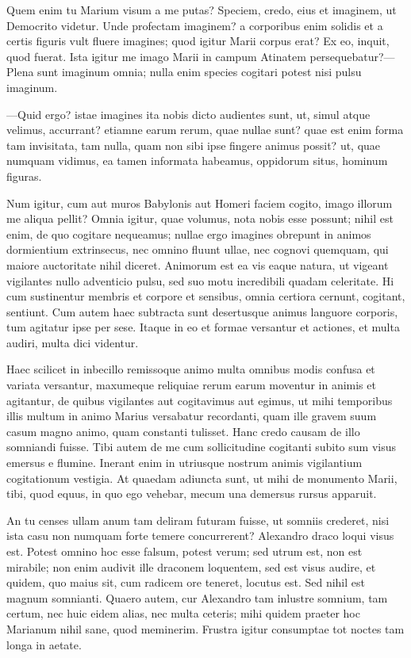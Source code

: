  Quem enim tu Marium visum a me putas? Speciem, credo, eius et imaginem, ut Democrito videtur. Unde profectam imaginem? a corporibus enim solidis et a certis figuris vult fluere imagines; quod igitur Marii corpus erat? Ex eo, inquit, quod fuerat. Ista igitur me imago Marii in campum Atinatem persequebatur?—Plena sunt imaginum omnia; nulla enim species cogitari potest nisi pulsu imaginum.

 —Quid ergo? istae imagines ita nobis dicto audientes sunt, ut, simul atque velimus, accurrant? etiamne earum rerum, quae nullae sunt? quae est enim forma tam invisitata, tam nulla, quam non sibi ipse fingere animus possit? ut, quae numquam vidimus, ea tamen informata habeamus, oppidorum situs, hominum figuras.

 Num igitur, cum aut muros Babylonis aut Homeri faciem cogito, imago illorum me aliqua pellit? Omnia igitur, quae volumus, nota nobis esse possunt; nihil est enim, de quo cogitare nequeamus; nullae ergo imagines obrepunt in animos dormientium extrinsecus, nec omnino fluunt ullae, nec cognovi quemquam, qui maiore auctoritate nihil diceret. Animorum est ea vis eaque natura, ut vigeant vigilantes nullo adventicio pulsu, sed suo motu incredibili quadam celeritate. Hi cum sustinentur membris et corpore et sensibus, omnia certiora cernunt, cogitant, sentiunt. Cum autem haec subtracta sunt desertusque animus languore corporis, tum agitatur ipse per sese. Itaque in eo et formae versantur et actiones, et multa audiri, multa dici videntur.

 Haec scilicet in inbecillo remissoque animo multa omnibus modis confusa et variata versantur, maxumeque reliquiae rerum earum moventur in animis et agitantur, de quibus vigilantes aut cogitavimus aut egimus, ut mihi temporibus illis multum in animo Marius versabatur recordanti, quam ille gravem suum casum magno animo, quam constanti tulisset. Hanc credo causam de illo somniandi fuisse. Tibi autem de me cum sollicitudine cogitanti subito sum visus emersus e flumine. Inerant enim in utriusque nostrum animis vigilantium cogitationum vestigia. At quaedam adiuncta sunt, ut mihi de monumento Marii, tibi, quod equus, in quo ego vehebar, mecum una demersus rursus apparuit.

 An tu censes ullam anum tam deliram futuram fuisse, ut somniis crederet, nisi ista casu non numquam forte temere concurrerent? Alexandro draco loqui visus est. Potest omnino hoc esse falsum, potest verum; sed utrum est, non est mirabile; non enim audivit ille draconem loquentem, sed est visus audire, et quidem, quo maius sit, cum radicem ore teneret, locutus est. Sed nihil est magnum somnianti. Quaero autem, cur Alexandro tam inlustre somnium, tam certum, nec huic eidem alias, nec multa ceteris; mihi quidem praeter hoc Marianum nihil sane, quod meminerim. Frustra igitur consumptae tot noctes tam longa in aetate.

